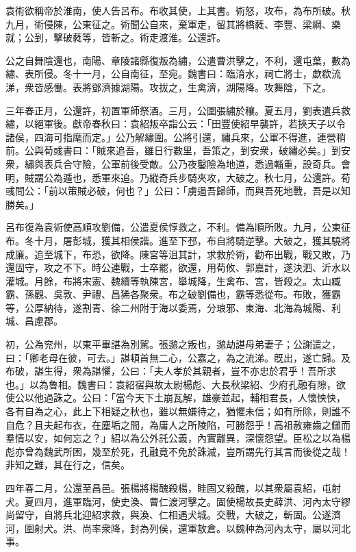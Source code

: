 \begin{pinyinscope}
袁術欲稱帝於淮南，使人告呂布。布收其使，上其書。術怒，攻布，為布所破。秋九月，術侵陳，公東征之。術聞公自來，棄軍走，留其將橋蕤、李豐、梁綱、樂就；公到，擊破蕤等，皆斬之。術走渡淮。公還許。

公之自舞陰還也，南陽、章陵諸縣復叛為繡，公遣曹洪擊之，不利，還屯葉，數為繡、表所侵。冬十一月，公自南征，至宛。魏書曰：臨淯水，祠亡將士，歔欷流涕，衆皆感慟。表將鄧濟據湖陽。攻拔之，生禽濟，湖陽降。攻舞陰，下之。

三年春正月，公還許，初置軍師祭酒。三月，公圍張繡於穰。夏五月，劉表遣兵救繡，以絕軍後。獻帝春秋曰：袁紹叛卒詣公云：「田豐使紹早襲許，若挾天子以令諸侯，四海可指麾而定。」公乃解繡圍。公將引還，繡兵來，公軍不得進，連營稍前。公與荀彧書曰：「賊來追吾，雖日行數里，吾策之，到安衆，破繡必矣。」到安衆，繡與表兵合守險，公軍前後受敵。公乃夜鑿險為地道，悉過輜重，設奇兵。會明，賊謂公為遁也，悉軍來追。乃縱奇兵步騎夾攻，大破之。秋七月，公還許。荀彧問公：「前以策賊必破，何也？」公曰：「虜遏吾歸師，而與吾死地戰，吾是以知勝矣。」

呂布復為袁術使高順攻劉備，公遣夏侯惇救之，不利。備為順所敗。九月，公東征布。冬十月，屠彭城，獲其相侯諧。進至下邳，布自將騎逆擊。大破之，獲其驍將成廉。追至城下，布恐，欲降。陳宮等沮其計，求救於術，勸布出戰，戰又敗，乃還固守，攻之不下。時公連戰，士卒罷，欲還，用荀攸、郭嘉計，遂決泗、沂水以灌城。月餘，布將宋憲、魏續等執陳宮，舉城降，生禽布、宮，皆殺之。太山臧霸、孫觀、吳敦、尹禮、昌狶各聚衆。布之破劉備也，霸等悉從布。布敗，獲霸等，公厚納待，遂割青、徐二州附于海以委焉，分琅邪、東海、北海為城陽、利城、昌慮郡。

初，公為兖州，以東平畢諶為別駕。張邈之叛也，邈劫諶母弟妻子；公謝遣之，曰：「卿老母在彼，可去。」諶頓首無二心，公嘉之，為之流涕。旣出，遂亡歸。及布破，諶生得，衆為諶懼，公曰：「夫人孝於其親者，豈不亦忠於君乎！吾所求也。」以為魯相。魏書曰：袁紹宿與故太尉楊彪、大長秋梁紹、少府孔融有隙，欲使公以他過誅之。公曰：「當今天下土崩瓦解，雄豪並起，輔相君長，人懷怏怏，各有自為之心，此上下相疑之秋也，雖以無嫌待之，猶懼未信；如有所除，則誰不自危？且夫起布衣，在塵垢之間，為庸人之所陵陷，可勝怨乎！高祖赦雍齒之讎而羣情以安，如何忘之？」紹以為公外託公義，內實離異，深懷怨望。臣松之以為楊彪亦曾為魏武所困，幾至於死，孔融竟不免於誅滅，豈所謂先行其言而後從之哉！非知之難，其在行之，信矣。

四年春二月，公還至昌邑。張楊將楊醜殺楊，眭固又殺醜，以其衆屬袁紹，屯射犬。夏四月，進軍臨河，使史渙、曹仁渡河擊之。固使楊故長史薛洪、河內太守繆尚留守，自將兵北迎紹求救，與渙、仁相遇犬城。交戰，大破之，斬固。公遂濟河，圍射犬。洪、尚率衆降，封為列侯，還軍敖倉。以魏种為河內太守，屬以河北事。


\end{pinyinscope}
